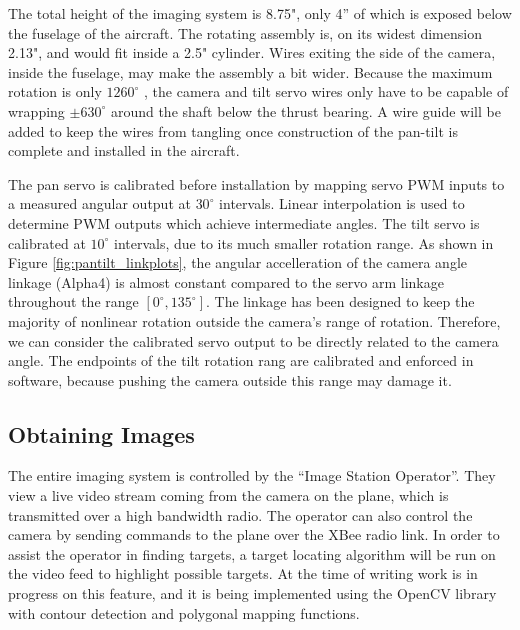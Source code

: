 \documentclass[10pt]{report}
\newcommand{\degrees}[1]
{
\begin{math}
#1^{\circ} 
\end{math}
}
\begin{document}
The total height of the imaging system is 8.75", only 4'' of which is exposed below the fuselage of the aircraft. The rotating assembly is, on its widest dimension 2.13", and would fit inside a 2.5" cylinder. Wires exiting the side of the camera, inside the fuselage, may make the assembly a bit wider. Because the maximum rotation is only \degrees{1260}, the camera and tilt servo wires only have to be capable of wrapping \degrees{\pm 630} around the shaft below the thrust bearing. A wire guide will be added to keep the wires from tangling once construction of the pan-tilt is complete and installed in the aircraft. 

The pan servo is calibrated before installation by mapping servo PWM inputs to a measured angular output at \degrees{30} intervals. Linear interpolation is used to determine PWM outputs which achieve intermediate angles. The tilt servo is calibrated at \degrees{10} intervals, due to its much smaller rotation range. As shown in Figure \ref{fig:pantilt_linkplots}, the angular accelleration of the camera angle linkage (Alpha4) is almost constant compared to the servo arm linkage throughout the range $[0^{\circ}, 135^{\circ}]$. The linkage has been designed to keep the majority of nonlinear rotation outside the camera's range of rotation. Therefore, we can consider the calibrated servo output to be directly related to the camera angle.
The endpoints of the tilt rotation rang are calibrated and enforced in software, because pushing the camera outside this range may damage it.

\subsection{Obtaining Images}

The entire imaging system is controlled by the ``Image Station Operator''.  They view a live video stream coming from the camera on the plane, which is transmitted over a high bandwidth radio.  The operator can also control the camera by sending commands to the plane over the XBee radio link.  In order to assist the operator in finding targets, a target locating algorithm will be run on the video feed to highlight possible targets.  At the time of writing work is in progress on this feature, and it is being implemented using the OpenCV library \cite{opencv} with contour detection and polygonal mapping functions.
\end{document}
